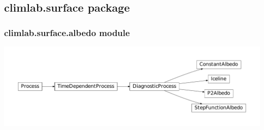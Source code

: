 \documentclass[a4paper,10pt,english]{sphinxmanual}
\begin{document}
\subsection{climlab.surface package}
\label{api/climlab.surface:climlab-surface-package}\label{api/climlab.surface::doc}

\subsubsection{climlab.surface.albedo module}
\label{api/climlab.surface:climlab-surface-albedo-module}
\includegraphics{inheritance-742cd8325d5c78229cd3bff3a540d679a72c377c.pdf}
\label{api/climlab.surface:module-climlab.surface.albedo}
\end{document}
